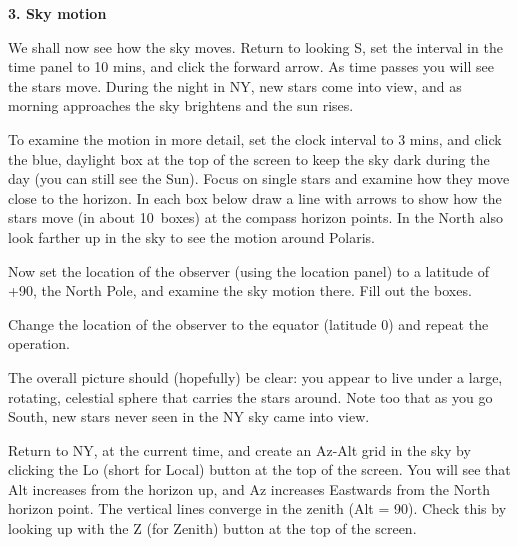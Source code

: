 \documentclass[12pt]{article}
\begin{document}
\newpage

\bigskip
\noindent
{\bf 3. Sky motion}

\medskip
\noindent
We shall now see how the sky moves. Return to looking S, set the
interval in the time panel to 10 mins, and click the forward arrow. As
time passes you will see the stars move. During the night in NY, new
stars come into view, and as morning approaches the sky brightens and
the sun rises.

To examine the motion in more detail, set the clock interval to 3
mins, and click the blue, daylight box at the top of the screen to
keep the sky dark during the day (you can still see the Sun). 
Focus on single stars and examine how they move close to the
horizon. In each box below draw a line with arrows to show how the
stars move (in about 10\deg\ boxes) at the compass horizon points. In the North also look
farther up in the sky to see the motion around Polaris.


        \begin{figure*}[h]
        \centerline{}
         \end{figure*}


\noindent
Now set the location of the observer (using the location panel) to a
latitude of +90\deg, the North Pole, and examine the sky motion
there. Fill out the boxes.



        \begin{figure*}[h]
        \centerline{}
         \end{figure*}

\noindent
Change the location of the observer to the equator (latitude 0\deg)
and repeat the operation.


        \begin{figure*}[h]
        \centerline{}
         \end{figure*}



The overall picture should (hopefully) be clear: you appear to live
under a large, rotating, celestial sphere that carries the stars
around. Note too that as you go South, new stars never seen in the NY
sky came into view.

 
\bigskip
\noindent

\newpage
{}

\medskip
\noindent
Return to NY, at the current time, and create an Az-Alt grid in the sky
by clicking the Lo (short for Local) button at the top of the screen. You will see that
Alt increases from the horizon up, and Az increases Eastwards from the
North horizon point. The vertical lines converge in the zenith (Alt =
90\deg). Check this by looking up with the Z (for Zenith) button at the
top of the screen.
\end{document}
